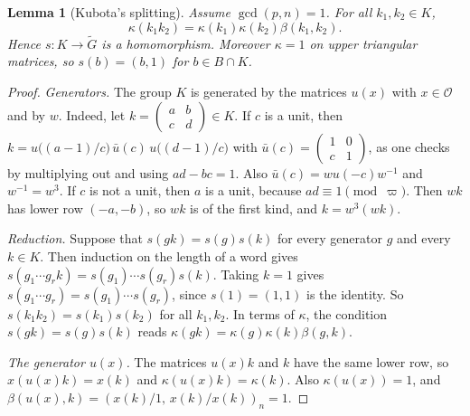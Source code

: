 \documentclass[12pt,letterpaper]{article}
\numberwithin{equation}{section}
\theoremstyle{plain}
\newtheorem{lemma}[theorem]{Lemma}
\theoremstyle{definition}
\theoremstyle{remark}
\newcommand{\Gt}{\widetilde G}
\newcommand{\Of}{\mathcal O}
\begin{document}
\begin{lemma}[Kubota's splitting]\label{lem:splitting}
Assume $\gcd(p,n)=1$. For all $k_1,k_2\in K$,
\[
\kappa(k_1k_2)=\kappa(k_1)\kappa(k_2)\beta(k_1,k_2).
\]
Hence $s:K\to\Gt$ is a homomorphism. Moreover $\kappa=1$ on upper
triangular matrices, so $s(b)=(b,1)$ for $b\in B\cap K$.
\end{lemma}

\begin{proof}
\emph{Generators.} The group $K$ is generated by the matrices $u(x)$
with $x\in\Of$ and by $w$. Indeed, let
$k=\left(\begin{smallmatrix}a&b\\c&d\end{smallmatrix}\right)\in K$. If
$c$ is a unit, then
$k=u\bigl((a-1)/c\bigr)\,\bar u(c)\,u\bigl((d-1)/c\bigr)$ with
$\bar u(c)=\left(\begin{smallmatrix}1&0\\c&1\end{smallmatrix}\right)$,
as one checks by multiplying out and using $ad-bc=1$. Also
$\bar u(c)=wu(-c)w^{-1}$ and $w^{-1}=w^3$. If $c$ is not a unit, then
$a$ is a unit, because $ad\equiv1\pmod\varpi$. Then $wk$ has lower row
$(-a,-b)$, so $wk$ is of the first kind, and $k=w^3(wk)$.

\emph{Reduction.} Suppose that $s(gk)=s(g)s(k)$ for every generator
$g$ and every $k\in K$. Then induction on the length of a word gives
$s(g_1\cdots g_rk)=s(g_1)\cdots s(g_r)s(k)$. Taking $k=1$ gives
$s(g_1\cdots g_r)=s(g_1)\cdots s(g_r)$, since $s(1)=(1,1)$ is the
identity. So $s(k_1k_2)=s(k_1)s(k_2)$ for all $k_1,k_2$. In terms of
$\kappa$, the condition $s(gk)=s(g)s(k)$ reads
$\kappa(gk)=\kappa(g)\kappa(k)\beta(g,k)$.

\emph{The generator $u(x)$.} The matrices $u(x)k$ and $k$ have the same
lower row, so $x(u(x)k)=x(k)$ and $\kappa(u(x)k)=\kappa(k)$. Also
$\kappa(u(x))=1$, and $\beta(u(x),k)=(x(k)/1,\,x(k)/x(k))_n=1$.


\end{proof}
\end{document}
